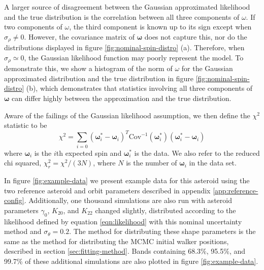 \documentclass{aastex631}
\begin{document}
A larger source of disagreement between the Gaussian approximated likelihood and the true distribution is the correlation between all three components of $\omega$. If two components of $\omega$, the third component is known up to its sign except when $\sigma_\rho \neq 0$. However, the covariance matrix of $\mathbf \omega$ does not capture this, nor do the distributions displayed in figure \ref{fig:nominal-spin-distro} (a). Therefore, when $\sigma_\rho \simeq 0$, the Gaussian likelihood function may poorly represent the model. To demonstrate this, we show a histogram of the norm of $\omega$ for the Gaussian approximated distribution and the true distribution in figure  \ref{fig:nominal-spin-distro} (b), which demonstrates that statistics involving all three components of $\mathbf \omega$ can differ highly between the approximation and the true distribution.

Aware of the failings of the Gaussian likelihood assumption, we then define the $\chi^2$ statistic to be
\begin{equation}
\chi^2 = \sum_{i=0} (\mathbf \omega_i^* - \mathbf \omega_i)^T\text{Cov}^{-1}(\mathbf\omega^*_i)(\mathbf \omega_i^* - \mathbf \omega_i)
\label{eqn:chisq-nominal}
\end{equation}
where $\mathbf \omega_i$ is the $i$th expected spin and $\mathbf \omega_i^*$ is the data. We also refer to the reduced chi squared, $\chi^2_r = \chi^2 / (3N)$, where $N$ is the number of $\mathbf \omega_i$ in the data set.

In figure \ref{fig:example-data} we present example data for this asteroid using the two reference asteroid and orbit parameters described in appendix \ref{app:reference-config}. Additionally, one thousand simulations are also run with asteroid parameters $\gamma_0$, $K_{20}$, and $K_{22}$ changed slightly, distributed according to the likelihood defined by equation \ref{eqn:likelihood} with this nominal uncertainty method and $\sigma_\theta = 0.2$. The method for distributing these shape parameters is the same as the method for distributing the MCMC initial walker positions, described in section \ref{sec:fitting-method}. Bands containing 68.3\%, 95.5\%, and 99.7\% of these additional simulations are also plotted in figure \ref{fig:example-data}.
\end{document}

